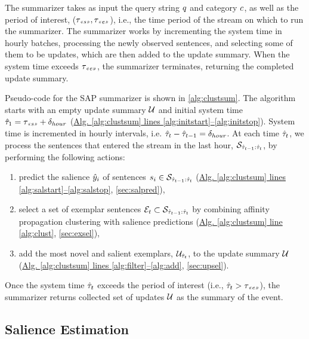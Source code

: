 

The summarizer takes as input the query string $q$ and category
$c$, as well as the period of interest, ($\tau_{\textit{<<s>>}}, \tau_{\textit{<<e>>}}$), i.e.,
the time period of the stream on which to run the summarizer. The summarizer
works by incrementing the system time in hourly batches, processing the newly
observed sentences, and selecting some of them to be updates, which are then
added to the update summary. When the system time exceeds $\tau_{\textit{<<e>>}}$, the
summarizer terminates, returning the completed update summary.

Pseudo-code for the SAP summarizer is shown in \autoref{alg:clustsum}.  The
algorithm starts with an empty update summary $\mathcal{U}$ and initial
system time $\hat{\tau}_1 = \tau_{\textit{<<s>>}} + \delta_{hour}$ (\hyperref[alg:clustsum]{Alg.
\ref{alg:clustsum} lines \ref{alg:initstart}--\ref{alg:initstop}}).  System
time is incremented in hourly intervals, i.e. $\hat{\tau}_{t} - \hat{\tau}_{{t-1}} =
\delta_{hour}$.  At each time $\hat{\tau}_t$, we process the sentences that entered the
stream in the last hour, $\mathcal{S}_{\hat{\tau}_{{t-1}}:\hat{\tau}_t}$, by performing
the following actions:
\begin{enumerate}
    \item predict the salience $\hat{y}_i$ of sentences $s_i \in
\mathcal{S}_{\hat{\tau}_{{t-1}}:\hat{\tau}_t}$
(\hyperref[alg:clustsum]{Alg. \ref{alg:clustsum} lines
\ref{alg:salstart}--\ref{alg:salstop}}, \autoref{sec:salpred}),
    \item select a set of exemplar sentences $\mathcal{E}_t \subset
\mathcal{S}_{\hat{\tau}_{{t-1}}:\hat{\tau}_t}$ by combining
affinity propagation clustering with salience predictions
(\hyperref[alg:clustsum]{Alg. \ref{alg:clustsum} line \ref{alg:clust}},
\autoref{sec:exsel}),
    \item add the most novel and salient exemplars,
$\mathcal{U}_{\hat{\tau}_t}$, to the update summary $\mathcal{U}$
(\hyperref[alg:clustsum]{Alg. \ref{alg:clustsum} lines
\ref{alg:filter}--\ref{alg:add}}, \autoref{sec:upsel}).
\end{enumerate}
Once the system time $\hat{\tau}_t$ exceeds the period of interest (i.e., $\hat{\tau}_t
> \tau_{\textit{<<e>>}}$), the summarizer returns collected set of updates $\mathcal{U}$
as the summary of the event.

\subsection{\colorbox{red!20!}{Salience Estimation}}
\label{sec:salpred}

